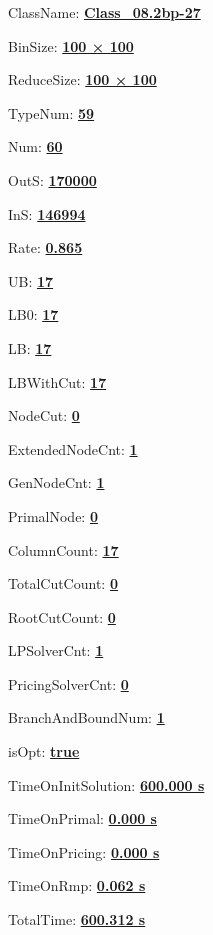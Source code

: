 \documentclass[11pt]{article}
\begin{document}
\pagestyle{empty}


ClassName: \underline{\textbf{Class_08.2bp-27}}
\par
BinSize: \underline{\textbf{100 × 100}}
\par
ReduceSize: \underline{\textbf{100 × 100}}
\par
TypeNum: \underline{\textbf{59}}
\par
Num: \underline{\textbf{60}}
\par
OutS: \underline{\textbf{170000}}
\par
InS: \underline{\textbf{146994}}
\par
Rate: \underline{\textbf{0.865}}
\par
UB: \underline{\textbf{17}}
\par
LB0: \underline{\textbf{17}}
\par
LB: \underline{\textbf{17}}
\par
LBWithCut: \underline{\textbf{17}}
\par
NodeCut: \underline{\textbf{0}}
\par
ExtendedNodeCnt: \underline{\textbf{1}}
\par
GenNodeCnt: \underline{\textbf{1}}
\par
PrimalNode: \underline{\textbf{0}}
\par
ColumnCount: \underline{\textbf{17}}
\par
TotalCutCount: \underline{\textbf{0}}
\par
RootCutCount: \underline{\textbf{0}}
\par
LPSolverCnt: \underline{\textbf{1}}
\par
PricingSolverCnt: \underline{\textbf{0}}
\par
BranchAndBoundNum: \underline{\textbf{1}}
\par
isOpt: \underline{\textbf{true}}
\par
TimeOnInitSolution: \underline{\textbf{600.000 s}}
\par
TimeOnPrimal: \underline{\textbf{0.000 s}}
\par
TimeOnPricing: \underline{\textbf{0.000 s}}
\par
TimeOnRmp: \underline{\textbf{0.062 s}}
\par
TotalTime: \underline{\textbf{600.312 s}}
\par
\newpage


\end{document}
